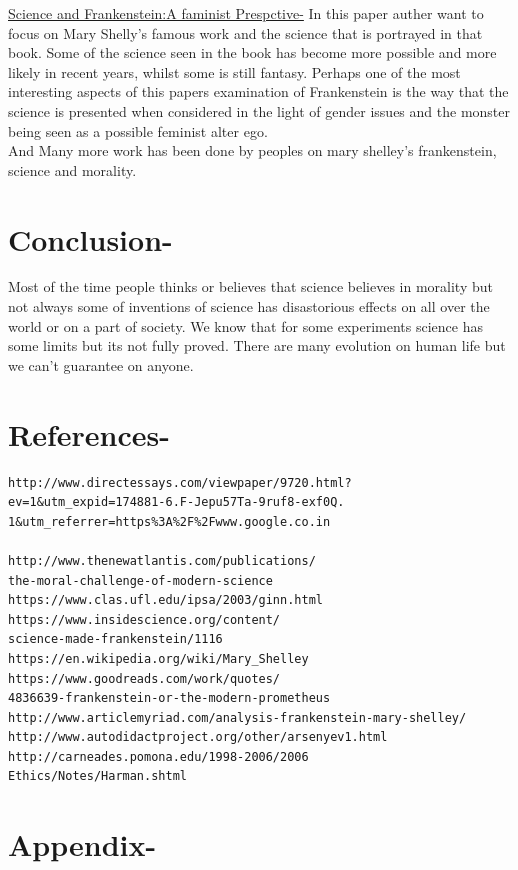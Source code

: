 \documentclass[12pt]{report}
\begin{document}
\underline{Science and Frankenstein:A faminist Prespctive-}
In this paper auther want to focus on Mary Shelly's famous work and the science that is portrayed in that book. Some of the science seen in the book has become more possible and more likely in recent years, whilst some is still fantasy. Perhaps one of the most interesting aspects of this papers examination of Frankenstein is the way that the science is presented when considered in the light of gender issues and the monster being seen as a possible feminist alter ego. \\

And Many more work has been done by peoples on mary shelley's frankenstein, science and morality.
\newpage
\section{Conclusion-}
Most of the time people thinks or believes that science believes in morality but not always some of inventions of science has disastorious effects on all over the world or on a part of society.
We know that for some experiments science has some limits but its not fully proved.
There are many evolution on human life but we can't guarantee on anyone.  
\newpage
\section{References-}
\begin{lstlisting}
http://www.directessays.com/viewpaper/9720.html?
ev=1&utm_expid=174881-6.F-Jepu57Ta-9ruf8-exf0Q.
1&utm_referrer=https%3A%2F%2Fwww.google.co.in

http://www.thenewatlantis.com/publications/
the-moral-challenge-of-modern-science
https://www.clas.ufl.edu/ipsa/2003/ginn.html
https://www.insidescience.org/content/
science-made-frankenstein/1116
https://en.wikipedia.org/wiki/Mary_Shelley
https://www.goodreads.com/work/quotes/
4836639-frankenstein-or-the-modern-prometheus
http://www.articlemyriad.com/analysis-frankenstein-mary-shelley/
http://www.autodidactproject.org/other/arsenyev1.html
http://carneades.pomona.edu/1998-2006/2006
Ethics/Notes/Harman.shtml
\end{lstlisting}
\section{Appendix-}
\end{document}
